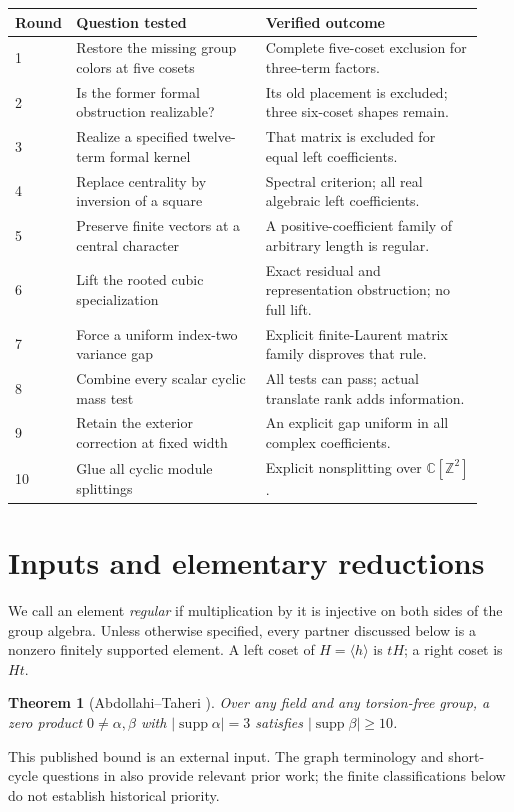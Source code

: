 \documentclass[11pt,a4paper,oneside]{report}
\newtheorem{theorem}{Theorem}[section]
\theoremstyle{definition}
\theoremstyle{remark}
\DeclareMathOperator{\supp}{supp}
\newcommand{\C}{\mathbb C}
\newcommand{\Z}{\mathbb Z}
\begin{document}
\begin{center}\small
\begin{tabular}{@{}p{0.07\linewidth}p{0.40\linewidth}p{0.46\linewidth}@{}}
\toprule
Round & Question tested & Verified outcome \\
\midrule
1 & Restore the missing group colors at five cosets
  & Complete five-coset exclusion for three-term factors.\\
2 & Is the former formal obstruction realizable?
  & Its old placement is excluded; three six-coset shapes remain.\\
3 & Realize a specified twelve-term formal kernel
  & That matrix is excluded for equal left coefficients.\\
4 & Replace centrality by inversion of a square
  & Spectral criterion; all real algebraic left coefficients.\\
5 & Preserve finite vectors at a central character
  & A positive-coefficient family of arbitrary length is regular.\\
6 & Lift the rooted cubic specialization
  & Exact residual and representation obstruction; no full lift.\\
7 & Force a uniform index-two variance gap
  & Explicit finite-Laurent matrix family disproves that rule.\\
8 & Combine every scalar cyclic mass test
  & All tests can pass; actual translate rank adds information.\\
9 & Retain the exterior correction at fixed width
  & An explicit gap uniform in all complex coefficients.\\
10 & Glue all cyclic module splittings
  & Explicit nonsplitting over $\C[\Z^2]$.\\
\bottomrule
\end{tabular}
\end{center}

\section{Inputs and elementary reductions}
We call an element \emph{regular} if multiplication by it is injective
on both sides of the group algebra. Unless otherwise specified, every
partner discussed below is a nonzero finitely supported element.
A left coset of $H=\langle h\rangle$ is $tH$; a right coset is $Ht$.

\begin{theorem}[Abdollahi--Taheri \cite{B:ATsmall}]\label{M10:thm:AT}
Over any field and any torsion-free group, a zero product
$0\ne\alpha,\beta$ with $|\supp\alpha|=3$ satisfies
$|\supp\beta|\ge10$.
\end{theorem}
This published bound is an external input. The graph terminology and
short-cycle questions in \cite{B:ATsmall} also provide relevant prior work;
the finite classifications below do not establish historical priority.
\end{document}
